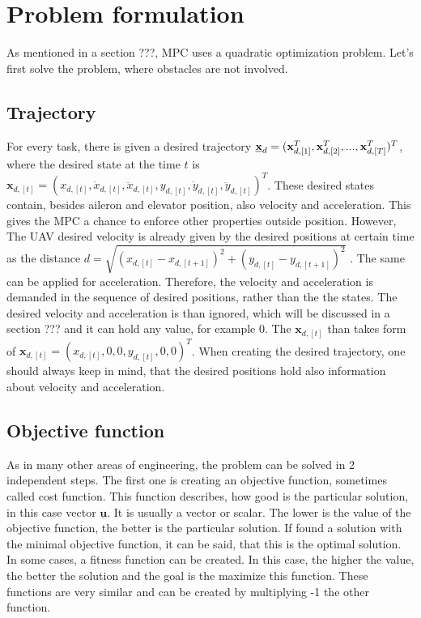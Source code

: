 \documentclass{article}
\begin{document}
\section{Problem formulation}
As mentioned in a section ???, MPC uses a quadratic optimization problem. Let's first solve the problem, where obstacles are not involved. 
\subsection{Trajectory}
For every task, there is given a desired trajectory $\textbf{\underline{x}}_d = 
(\textbf{x}_{d,[1]}^T, \textbf{x}_{d,[2]}^T, ..., \textbf{x}_{d,[T]}^T)^T$, where the desired state at the time $t$ is $\textbf{x}_{d,[t]} = (x_{d,[t]}, \dot{x}_{d,[t]}, \ddot{x}_{d,[t]}, y_{d,[t]}, \dot{y}_{d,[t]}, \ddot{y}_{d,[t]})^T$. These desired states contain, besides aileron and elevator position, also velocity and acceleration. This gives the MPC a chance to  enforce other properties outside position. However, The UAV desired velocity is already given by the desired positions at certain time as the distance $d = \sqrt{(x_{d,[t]}-x_{d,[t+1]})^2+ (y_{d,[t]}- y_{d,[t+1]})^2}$ . The same can be applied for acceleration. Therefore, the velocity and acceleration is demanded in the sequence of desired positions, rather than the the states. The desired velocity and acceleration is than ignored, which will be discussed in a section ??? and it can hold any value, for example 0. The $\textbf{x}_{d,[t]}$ than takes form of $\textbf{x}_{d,[t]} = (x_{d,[t]}, 0, 0, y_{d,[t]}, 0, 0)^T$. When creating the desired trajectory, one should always keep in mind, that the desired positions hold also information about velocity and acceleration. 

\subsection{Objective function}
As in many other areas of engineering, the problem can be solved in 2 independent steps. The first one is creating an objective function, sometimes called cost function. This function describes, how good is the particular solution, in this case vector $\underline{\textbf{u}}$. It is usually a vector or scalar. The lower is the value of the objective function, the better is the particular solution. If found a solution with the minimal objective function, it can be said, that this is the optimal solution. In some cases, a fitness function can be created. In this case, the higher the value, the better the solution and the goal is the maximize this function. These functions are very similar and can be created by multiplying -1 the other function.
\end{document}
